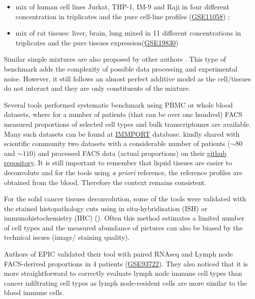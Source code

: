 \documentclass[12pt,]{book}
\providecommand{\tightlist}{%
  \setlength{\itemsep}{0pt}\setlength{\parskip}{0pt}}
\theoremstyle{definition}
\theoremstyle{definition}
\theoremstyle{definition}
\theoremstyle{remark}
\begin{document}
\begin{itemize}
\tightlist
\item
  mix of human cell lines Jurkat, THP-1, IM-9 and Raji in four different
  concentration in triplicates and the pure cell-line profiles
  (\href{https://www.ncbi.nlm.nih.gov/geo/query/acc.cgi?acc=GSE11058}{GSE11058})
  \citep{Abbas2009};
\item
  mix of rat tissues: liver, brain, lung mixed in 11 different
  concentrations in triplicates and the pure tissues
  expression(\href{https://www.ncbi.nlm.nih.gov/geo/query/acc.cgi?acc=GSE19830}{GSE19830})
  \citep{ShenOrr2010}
\end{itemize}

Similar simple mixtures are also proposed by other authors
\citep[\citet{Kuhn2011}]{Becht2016}. This type of benchmark adds the
complexity of possible data processing and experimental noise. However,
it still follows an almost perfect additive model as the cell/tissues do
not interact and they are only constituents of the mixture.

Several tools performed systematic benchmark using PBMC or whole blood
datasets, where for a number of patients (that can be over one hundred)
FACS measured proportions of selected cell types and bulk transcriptomes
are available. Many such datasets can be found at
\href{http://www.immport.org/immport-open/public/home/home}{IMMPORT}
database. \citet{Aran2017} kindly shared with scientific community two
datasets with a considerable number of patients (\(\sim80\) and
\(\sim110\)) and processed FACS data (actual proportions) on their
\href{https://github.com/dviraran/xCell/blob/master/Dev_scripts/xCell_ImmPort.zip}{github
repository}. It is still important to remember that liquid tissues are
easier to deconvolute and for the tools using \emph{a priori} reference,
the reference profiles are obtained from the blood. Therefore the
context remains consistent.

For the solid cancer tissues deconvolution, some of the tools were
validated with the stained histopathology cuts using in
situ-hybridisation (ISH) \citep{Kuhn2011} or immunohistochemistry (IHC)
(\citet{Becht2016}). Often this method estimates a limited number of
cell types and the measured abundance of pictures can also be biased by
the technical issues (image/ staining quality).

Authors of EPIC validated their tool with paired RNAseq and Lymph node
FACS-derived proportions in 4 patients
(\href{https://www.ncbi.nlm.nih.gov/geo/query/acc.cgi?acc=GSE93722}{GSE93722}).
They also noticed that it is more straightforward to correctly evaluate
lymph node immune cell types than cancer infiltrating cell types as
lymph node-resident cells are more similar to the blood immune cells.
\end{document}
